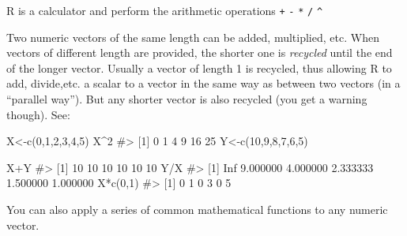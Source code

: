 \documentclass[
  letterpaper,
  DIV=11,
  numbers=noendperiod]{scrreprt}
\newenvironment{Shaded}{\begin{snugshade}}{\end{snugshade}}
\newcommand{\CommentTok}[1]{\textcolor[rgb]{0.37,0.37,0.37}{#1}}
\newcommand{\DecValTok}[1]{\textcolor[rgb]{0.68,0.00,0.00}{#1}}
\newcommand{\FunctionTok}[1]{\textcolor[rgb]{0.28,0.35,0.67}{#1}}
\newcommand{\NormalTok}[1]{\textcolor[rgb]{0.00,0.23,0.31}{#1}}
\newcommand{\OtherTok}[1]{\textcolor[rgb]{0.00,0.23,0.31}{#1}}
\newcommand{\SpecialCharTok}[1]{\textcolor[rgb]{0.37,0.37,0.37}{#1}}
\begin{document}
R is a calculator and perform the arithmetic operations \texttt{+}
\texttt{-} \texttt{*} \texttt{/} \texttt{\^{}}

Two numeric vectors of the same length can be added, multiplied, etc.
When vectors of different length are provided, the shorter one is
\emph{recycled} until the end of the longer vector. Usually a vector of
length 1 is recycled, thus allowing R to add, divide,etc. a scalar to a
vector in the same way as between two vectors (in a ``parallel way'').
But any shorter vector is also recycled (you get a warning though). See:

\begin{Shaded}
\begin{Highlighting}[]
\NormalTok{X}\OtherTok{\textless{}{-}}\FunctionTok{c}\NormalTok{(}\DecValTok{0}\NormalTok{,}\DecValTok{1}\NormalTok{,}\DecValTok{2}\NormalTok{,}\DecValTok{3}\NormalTok{,}\DecValTok{4}\NormalTok{,}\DecValTok{5}\NormalTok{)}
\NormalTok{X}\SpecialCharTok{\^{}}\DecValTok{2}
\CommentTok{\#\textgreater{} [1]  0  1  4  9 16 25}
\NormalTok{Y}\OtherTok{\textless{}{-}}\FunctionTok{c}\NormalTok{(}\DecValTok{10}\NormalTok{,}\DecValTok{9}\NormalTok{,}\DecValTok{8}\NormalTok{,}\DecValTok{7}\NormalTok{,}\DecValTok{6}\NormalTok{,}\DecValTok{5}\NormalTok{)}

\NormalTok{X}\SpecialCharTok{+}\NormalTok{Y}
\CommentTok{\#\textgreater{} [1] 10 10 10 10 10 10}
\NormalTok{Y}\SpecialCharTok{/}\NormalTok{X}
\CommentTok{\#\textgreater{} [1]      Inf 9.000000 4.000000 2.333333 1.500000 1.000000}
\NormalTok{X}\SpecialCharTok{*}\FunctionTok{c}\NormalTok{(}\DecValTok{0}\NormalTok{,}\DecValTok{1}\NormalTok{)}
\CommentTok{\#\textgreater{} [1] 0 1 0 3 0 5}
\end{Highlighting}
\end{Shaded}

You can also apply a series of common mathematical functions to any
numeric vector.
\end{document}

